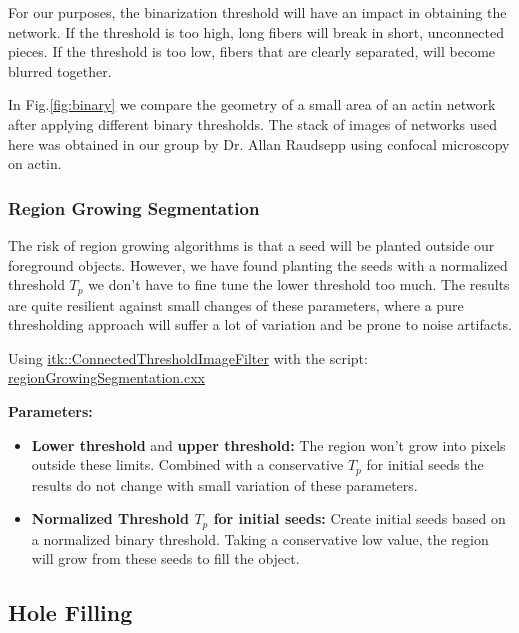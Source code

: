 For our purposes, the binarization threshold will have an impact in obtaining the
network. If the threshold is too high, long fibers will break in short,
unconnected pieces. If the threshold is too low, fibers that are clearly
separated, will become blurred together.

In Fig.\ref{fig:binary}
we compare the geometry of a small area of an actin network after
applying different binary thresholds. The stack of images of
networks used here was obtained in our group by Dr. Allan
Raudsepp using confocal microscopy on actin.

\subsubsection{Region Growing Segmentation}%
\label{subsub:region_growing_segmentation}

The risk of region growing algorithms is that a seed will be planted outside our foreground objects. However, we have found planting the seeds with a normalized threshold $T_p$ we don't have to fine tune the lower threshold too much. The results are quite resilient against small changes of these parameters, where a pure thresholding approach will suffer a lot of variation and be prone to noise artifacts.

Using \href{https://itk.org/Doxygen/html/classitk_1_1ConnectedThresholdImageFilter.html}{itk::ConnectedThresholdImageFilter} with the script:
\href{https://github.com/phcerdan/ITKfilters/blob/master/scripts-cpp/regionGrowingSegmentation.cxx}{regionGrowingSegmentation.cxx}

\noindent\textbf{Parameters:}

\begin{itemize}[topsep=0pt]
  \item \textbf{Lower threshold} and \textbf{upper threshold: } The region won't grow into pixels outside these limits. Combined with a conservative $T_p$ for initial seeds the results do not change with small variation of these parameters.
  \item \textbf{Normalized Threshold $T_p$ for initial seeds: } Create initial seeds based on a normalized binary threshold. Taking a conservative low value, the region will grow from these seeds to fill the object.
\end{itemize}

\subsection{Hole Filling}%
\label{sub:hole_filling}

